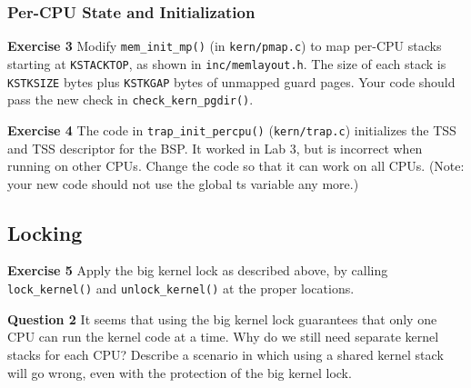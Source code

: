 \documentclass[11pt]{article}
\begin{document}
\subsubsection{Per-CPU State and Initialization}
\begin{framed}
\noindent\textbf{Exercise 3} Modify \lstinline|mem_init_mp()| (in \lstinline|kern/pmap.c|) to map per-CPU stacks starting at \lstinline|KSTACKTOP|, as shown in \lstinline|inc/memlayout.h|. The size of each stack is \lstinline|KSTKSIZE| bytes plus \lstinline|KSTKGAP| bytes of unmapped guard pages. Your code should pass the new check in \lstinline|check_kern_pgdir()|.
\end{framed}

\begin{framed}
\noindent\textbf{Exercise 4} The code in \lstinline|trap_init_percpu()| (\lstinline|kern/trap.c|) initializes the TSS and TSS descriptor for the BSP. It worked in Lab 3, but is incorrect when running on other CPUs. Change the code so that it can work on all CPUs. (Note: your new code should not use the global ts variable any more.)
\end{framed}

\subsection{Locking}
\begin{framed}
\noindent\textbf{Exercise 5} Apply the big kernel lock as described above, by calling \lstinline|lock_kernel()| and \lstinline|unlock_kernel()| at the proper locations.
\end{framed}
\begin{framed}
\noindent\textbf{Question 2} It seems that using the big kernel lock guarantees that only one CPU can run the kernel code at a time. Why do we still need separate kernel stacks for each CPU? Describe a scenario in which using a shared kernel stack will go wrong, even with the protection of the big kernel lock.
\end{framed}
\end{document}

